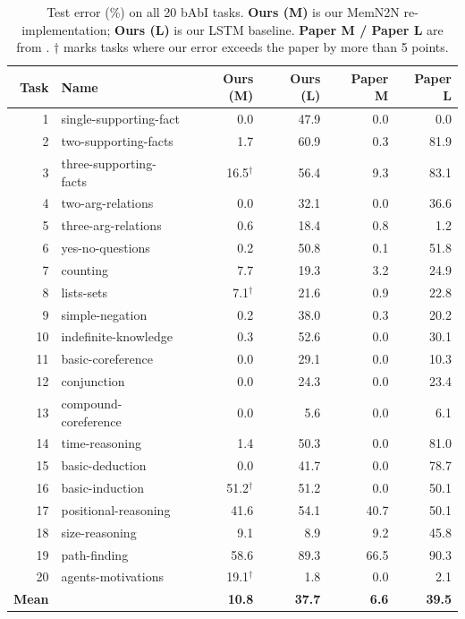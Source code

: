 \documentclass{article} %
\begin{document}
\begin{table}[h]
\centering
\caption{Test error (\%) on all 20 bAbI tasks. \textbf{Ours (M)} is our MemN2N re-implementation; \textbf{Ours (L)} is our LSTM baseline. \textbf{Paper M / Paper L} are from \citet{sukhbaatar2015end}. $\dagger$ marks tasks where our error exceeds the paper by more than 5 points.}
\label{tab:baseline}
\vspace{4pt}
\small
\begin{tabular}{rlrrrr}
\toprule
\textbf{Task} & \textbf{Name} & \textbf{Ours (M)} & \textbf{Ours (L)} & \textbf{Paper M} & \textbf{Paper L} \\
\midrule
1  & single-supporting-fact   &  0.0          & 47.9 &  0.0 &  0.0 \\
2  & two-supporting-facts     &  1.7          & 60.9 &  0.3 & 81.9 \\
3  & three-supporting-facts   & 16.5$^\dagger$& 56.4 &  9.3 & 83.1 \\
4  & two-arg-relations        &  0.0          & 32.1 &  0.0 & 36.6 \\
5  & three-arg-relations      &  0.6          & 18.4 &  0.8 &  1.2 \\
6  & yes-no-questions         &  0.2          & 50.8 &  0.1 & 51.8 \\
7  & counting                 &  7.7          & 19.3 &  3.2 & 24.9 \\
8  & lists-sets               &  7.1$^\dagger$& 21.6 &  0.9 & 22.8 \\
9  & simple-negation          &  0.2          & 38.0 &  0.3 & 20.2 \\
10 & indefinite-knowledge     &  0.3          & 52.6 &  0.0 & 30.1 \\
11 & basic-coreference        &  0.0          & 29.1 &  0.0 & 10.3 \\
12 & conjunction              &  0.0          & 24.3 &  0.0 & 23.4 \\
13 & compound-coreference     &  0.0          &  5.6 &  0.0 &  6.1 \\
14 & time-reasoning           &  1.4          & 50.3 &  0.0 & 81.0 \\
15 & basic-deduction          &  0.0          & 41.7 &  0.0 & 78.7 \\
16 & basic-induction          & 51.2$^\dagger$& 51.2 &  0.0 & 50.1 \\
17 & positional-reasoning     & 41.6          & 54.1 & 40.7 & 50.1 \\
18 & size-reasoning           &  9.1          &  8.9 &  9.2 & 45.8 \\
19 & path-finding             & 58.6          & 89.3 & 66.5 & 90.3 \\
20 & agents-motivations       & 19.1$^\dagger$&  1.8 &  0.0 &  2.1 \\
\midrule
\textbf{Mean} & & \textbf{10.8} & \textbf{37.7} & \textbf{6.6} & \textbf{39.5} \\
\bottomrule
\end{tabular}
\end{table}
\end{document}
